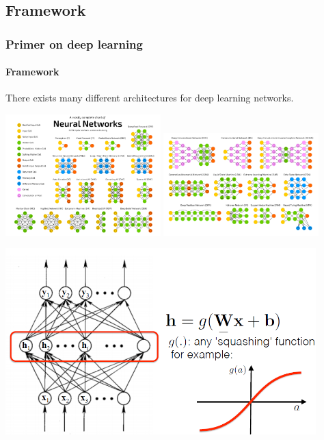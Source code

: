 \documentclass{beamer}
\begin{document}
\subsection{Framework}
\begin{frame}
\frametitle{Primer on deep learning}
\framesubtitle{Framework}
There exists many different architectures for deep learning networks.
\begin{center}
\includegraphics[width=0.45\textwidth]{images/deepnetworks_architecture_1.PNG}
\includegraphics[width=0.45\textwidth]{images/deepnetworks_architecture_2.PNG} 
\end{center}
\end{frame}
\begin{frame}
\includegraphics[width=0.9\textwidth]{images/deep_network.PNG}
\end{frame}
\end{document}
